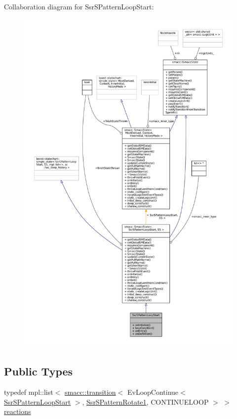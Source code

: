 Collaboration diagram for Ssr\+S\+Pattern\+Loop\+Start\+:
\nopagebreak
\begin{figure}[H]
\begin{center}
\leavevmode
\includegraphics[width=350pt]{structSsrSPatternLoopStart__coll__graph}
\end{center}
\end{figure}
\subsection*{Public Types}
\begin{DoxyCompactItemize}
\item 
typedef mpl\+::list$<$ \hyperlink{classsmacc_1_1transition}{smacc\+::transition}$<$ Ev\+Loop\+Continue$<$ \hyperlink{structSsrSPatternLoopStart}{Ssr\+S\+Pattern\+Loop\+Start} $>$, \hyperlink{structSsrSPatternRotate1}{Ssr\+S\+Pattern\+Rotate1}, C\+O\+N\+T\+I\+N\+U\+E\+L\+O\+OP $>$ $>$ \hyperlink{structSsrSPatternLoopStart_ac4859d7b58f82f99351f14a8ff7a26c3}{reactions}
\end{DoxyCompactItemize}
